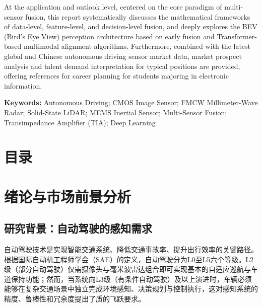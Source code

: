 \documentclass[12pt,a4paper,openany,UTF8]{ctexbook}
\begin{document}
At the application and outlook level, centered on the core paradigm of multi-sensor fusion, this report systematically discusses the mathematical frameworks of data-level, feature-level, and decision-level fusion, and deeply explores the BEV (Bird's Eye View) perception architecture based on early fusion and Transformer-based multimodal alignment algorithms. Furthermore, combined with the latest global and Chinese autonomous driving sensor market data, market prospect analysis and talent demand interpretation for typical positions are provided, offering references for career planning for students majoring in electronic information.

\vspace{1em}
\noindent\textbf{Keywords:} Autonomous Driving; CMOS Image Sensor; FMCW Millimeter-Wave Radar; Solid-State LiDAR; MEMS Inertial Sensor; Multi-Sensor Fusion; Transimpedance Amplifier (TIA); Deep Learning

\clearpage

\setcounter{tocdepth}{2}
\chapter*{\heiti 目\qquad 录}
\tableofcontents
\clearpage

\setcounter{page}{1}

\chapter{绪论与市场前景分析}

\section{研究背景：自动驾驶的感知需求}

自动驾驶技术是实现智能交通系统、降低交通事故率、提升出行效率的关键路径。根据国际自动机工程师学会（SAE）的定义，自动驾驶分为L0至L5六个等级。L2级（部分自动驾驶）仅需摄像头与毫米波雷达组合即可实现基本的自适应巡航与车道保持功能；然而，当系统向L3级（有条件自动驾驶）及以上演进时，车辆必须能够在复杂交通场景中独立完成环境感知、决策规划与控制执行，这对感知系统的精度、鲁棒性和冗余度提出了质的飞跃要求。
\end{document}

